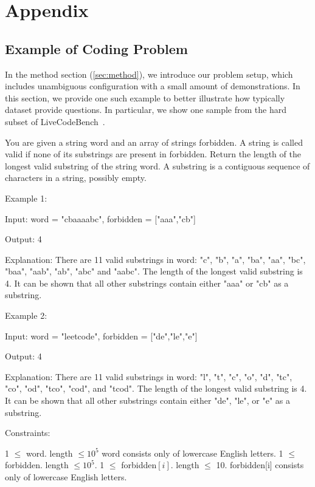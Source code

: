 
\appendix

\section{Appendix}
\label{sec:appendix}

\subsection{Example of Coding Problem}
\label{sec:appendix_example_code}
In the method section (\cref{sec:method}), we introduce our problem setup, which includes unambiguous configuration with a small amount of demonstrations. In this section, we provide one such example to better illustrate how typically dataset provide questions. In particular, we show one sample from the hard subset of LiveCodeBench~\citep{jain2024livecodebench}.

\begin{tcolorbox}
[colback=white,colframe=gray,title=Question]
You are given a string word and an array of strings forbidden.
A string is called valid if none of its substrings are present in forbidden.
Return the length of the longest valid substring of the string word.
A substring is a contiguous sequence of characters in a string, possibly empty.
\newline

Example 1:

Input: word = "cbaaaabc", forbidden = ["aaa","cb"]

Output: 4

Explanation: There are 11 valid substrings in word: "c", "b", "a", "ba", "aa", "bc", "baa", "aab", "ab", "abc" and "aabc". The length of the longest valid substring is 4. 
It can be shown that all other substrings contain either "aaa" or "cb" as a substring. 
\newline

Example 2:

Input: word = "leetcode", forbidden = ["de","le","e"]

Output: 4

Explanation: There are 11 valid substrings in word: "l", "t", "c", "o", "d", "tc", "co", "od", "tco", "cod", and "tcod". The length of the longest valid substring is 4.
It can be shown that all other substrings contain either "de", "le", or "e" as a substring. 
\newline
 
Constraints:

1 $\leq$ word. length $\leq 10^5$ word consists only of lowercase English letters. 1 $\leq$ forbidden. length $\leq 10^5$. 1 $\leq$ forbidden$[i]$. length $\leq$ 10. forbidden[i] consists only of lowercase English letters.

\label{box:example_code}
\end{tcolorbox}

